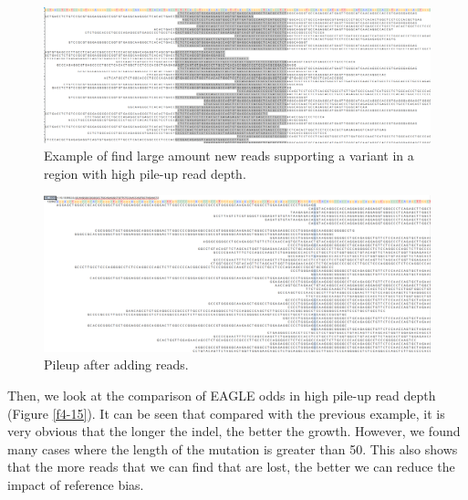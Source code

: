 \vspace{1cm}
\begin{figure}[H]
    \centering
    \includegraphics[width=1\columnwidth]{body/image/4-13.png}
    \captionsetup{labelfont=bf}
    \renewcommand{\baselinestretch}{1.0}
    \vspace{-1cm}
    \caption[New reads in a region with high pile-up read depth]{Example of find large amount new reads supporting a variant in a region with high pile-up read depth.}
    \label{f4-13}
\end{figure}
\vspace{0.5cm}
\begin{figure}[H]
    \centering
    \includegraphics[width=1\columnwidth]{body/image/4-14.png}
    \captionsetup{labelfont=bf}
    \renewcommand{\baselinestretch}{1.0}
    \vspace{-1cm}
    \caption[variant pileup in high pile-up read depth]{Pileup after adding reads.}
    \label{f4-14}
\end{figure}

Then, we look at the comparison of EAGLE odds in high pile-up read depth (Figure \ref{f4-15}). It can be seen that compared with the previous example, it is very obvious that the longer the indel, the better the growth. However, we found many cases where the length of the mutation is greater than 50. This also shows that the more reads that we can find that are lost, the better we can reduce the impact of reference bias.

